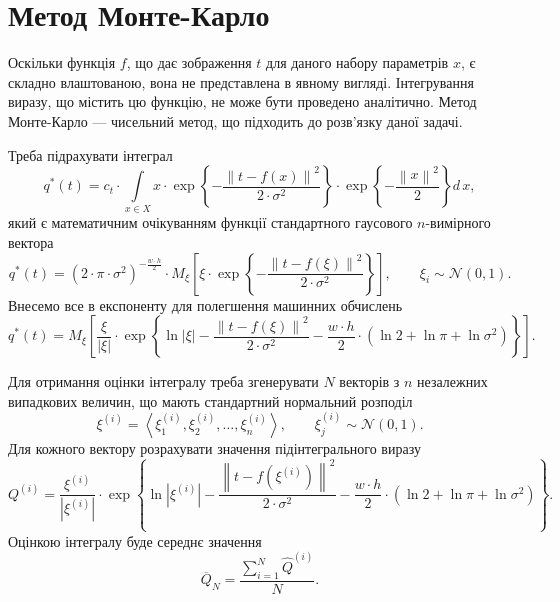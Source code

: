 \section{Метод Монте-Карло}

Оскільки функція $f$, що дає зображення $t$ для даного набору параметрів $x$,
є складно влаштованою, вона не представлена в явному вигляді.
Інтегрування виразу, що містить цю функцію, не може бути проведено аналітично.
Метод Монте-Карло --- чисельний метод, що підходить до розв'язку даної задачі.

Треба підрахувати інтеграл
\begin{equation*}
  q^* \left( t \right)
  = c_t
    \cdot \int\limits_{x \in X}
      x
      \cdot \exp{\left\{ - \frac{\left\| t - f\left( x \right) \right\|^2}
                                {2 \cdot \sigma^2} \right\}}
      \cdot \exp{\left\{ - \frac{\left\| x \right\|^2}{2} \right\}}
    d\,x,
\end{equation*}
який є математичним очікуванням функції
стандартного гаусового $n$-вимірного вектора
\begin{equation*}
  q^* \left( t \right)
  = \left( 2 \cdot \pi \cdot \sigma^2 \right)^{-\frac{w \cdot h}{2}}
    \cdot M_{\xi}\left[
      \xi
      \cdot \exp{\left\{ - \frac{\left\| t - f\left( \xi \right) \right\|^2}
        {2 \cdot \sigma^2} \right\}} \right], \qquad
    \xi_i \sim \mathcal{N}\left( 0, 1 \right).
\end{equation*}
Внесемо все в експоненту для полегшення машинних обчислень
\begin{equation*}
  q^* \left( t \right)
  = M_{\xi}\left[
    \frac{\xi}{\left| \xi \right|}
    \cdot \exp{\left\{
        \ln{\left| \xi \right|}
        - \frac{\left\| t - f\left( \xi \right) \right\|^2}{2 \cdot \sigma^2}
        - \frac{w \cdot h}{2}
          \cdot \left( \ln{2} + \ln{\pi} + \ln{\sigma^2} \right)
       \right\}
    } \right].
\end{equation*}

Для отримання оцінки інтегралу
треба згенерувати $N$ векторів з $n$ незалежних випадкових величин,
що мають стандартний нормальний розподіл
\begin{equation*}
  \xi^{\left( i \right)}
  = \left\langle \xi^{\left( i \right)}_1, \xi^{\left( i \right)}_2, \dots,
  \xi^{\left( i \right)}_n \right\rangle,\qquad
  \xi^{\left( i \right)}_j \sim \mathcal{N}\left( 0, 1 \right).
\end{equation*}
Для кожного вектору розрахувати значення підінтегрального виразу
\begin{equation*}
  Q^{\left( i \right)}
  = \frac{\xi^{\left( i \right)}}{\left| \xi^{\left( i \right)} \right|}
  \cdot \exp{\left\{
      \ln{\left| \xi^{\left( i \right)} \right|}
      - \frac{\left\| t - f\left( \xi^{\left( i \right)} \right) \right\|^2}{2 \cdot \sigma^2}
      - \frac{w \cdot h}{2}
        \cdot \left( \ln{2} + \ln{\pi} + \ln{\sigma^2} \right)
     \right\}
   }.
\end{equation*}
Оцінкою інтегралу буде середнє значення
\begin{equation*}
  \overline{Q}_N = \frac{\sum\limits_{i=1}^{N}
    \hat{Q}^{\left( i \right)}}{N}.
\end{equation*}

